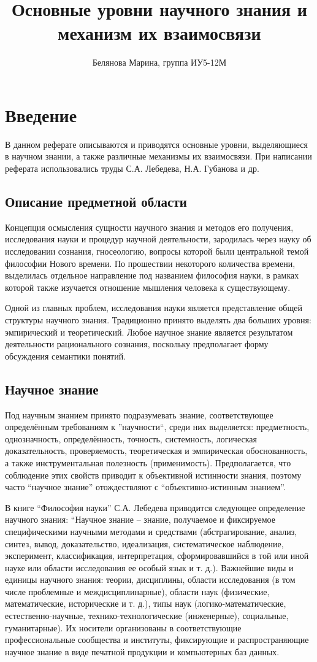 \documentclass[14pt]{article}
\title{Основные уровни научного знания и механизм их взаимосвязи}
\author{Белянова Марина, группа ИУ5-12М}
\begin{document}
\maketitle
\tableofcontents

\section{Введение}

В данном реферате описываются и приводятся основные уровни, выделяющиеся в научном знании, а также различные механизмы их взаимосвязи. При написании реферата использовались труды С.А. Лебедева, Н.А. Губанова и др.
\subsection{Описание предметной области}
Концепция осмысления сущности научного знания и методов его получения, исследования науки и процедур научной деятельности, зародилась через науку об исследовании сознания, гносеологию, вопросы которой были центральной темой философии Нового времени. По прошествии некоторого количества времени, выделилась отдельное направление под названием философия науки, в рамках которой также изучается отношение мышления человека к существующему.


Одной из главных проблем, исследования науки является представление общей структуры научного знания. Традиционно принято выделять два больших уровня: эмпирический и теоретический. Любое научное знание является результатом деятельности рационального сознания, поскольку предполагает форму обсуждения семантики понятий.
\subsection{Научное знание}
Под научным знанием принято подразумевать знание, соответствующее определённым требованиям к ''научности``, среди них выделяется: предметность, однозначность, определённость, точность, системность, логическая доказательность, проверяемость, теоретическая и эмпирическая обоснованность, а также инструментальная полезность (применимость). Предполагается, что соблюдение этих свойств приводит к объективной истинности знания, поэтому часто ``научное знание'' отождествляют с ``объективно-истинным знанием''.

 В книге ``Философия науки'' С.А. Лебедева приводится следующее определение научного знания: ``Научное знание -- знание, получаемое и фиксируемое специфическими научными методами и средствами (абстра­гирование, анализ, синтез, вывод, доказательство, идеализация, систематическое наблюдение, эксперимент, классификация, интерпретация, сформировавшийся в той или иной науке или области исследования ее особый язык и т. д.). Важнейшие виды и единицы научного знания: теории, дисциплины, области исследования (в том числе проблемные и междисциплинарные), области наук (физические, математические, исторические и т. д.), типы наук (логико-математические, естественно-научные, технико-технологические (инженерные), социальные, гуманитарные). Их носители организованы в соответствующие профессиональные сообщества и институты, фиксирующие и распространяющие научное знание в виде печатной продукции и компьютерных баз данных.
\end{document}
